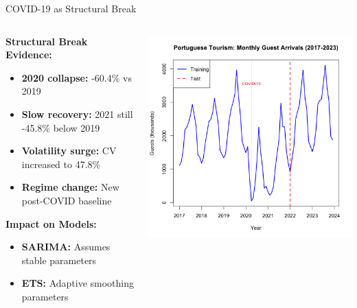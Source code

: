 \documentclass[10pt]{beamer}
\begin{document}
\begin{frame}{COVID-19 as Structural Break}
\begin{columns}
\begin{column}{0.45\textwidth}
\textbf{Structural Break Evidence:}
\begin{itemize}
\item \textbf{2020 collapse:} -60.4\% vs 2019
\item \textbf{Slow recovery:} 2021 still -45.8\% below 2019
\item \textbf{Volatility surge:} CV increased to 47.8\%
\item \textbf{Regime change:} New post-COVID baseline
\end{itemize}

\vspace{0.3cm}
\textbf{Impact on Models:}
\begin{itemize}
\item \textbf{SARIMA:} Assumes stable parameters
\item \textbf{ETS:} Adaptive smoothing parameters
\end{itemize}
\end{column}

\begin{column}{0.55\textwidth}
\includegraphics[width=\textwidth,height=0.85\textheight,keepaspectratio]{plots/monthly-guest-arrivals.png}
\end{column}
\end{columns}

\end{frame}
\end{document}
